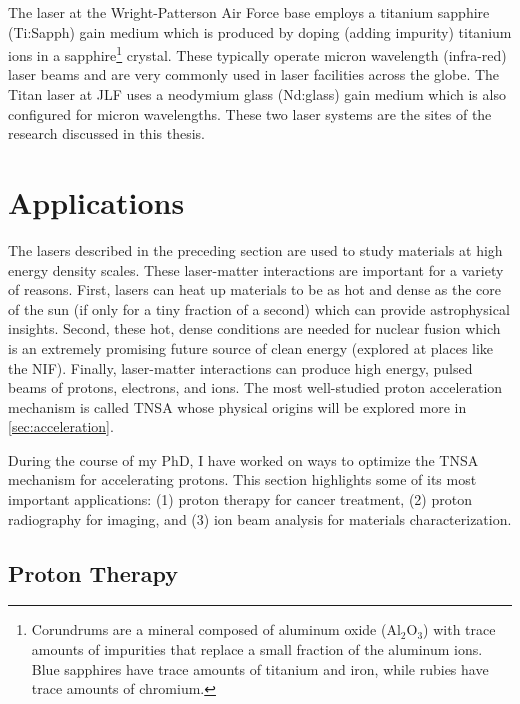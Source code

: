 The laser at the Wright-Patterson Air Force base employs a titanium sapphire (Ti:Sapph) gain medium which is produced by doping (adding impurity) titanium ions in a sapphire\footnote{Corundrums are a mineral composed of aluminum oxide ($\text{Al}_2\text{O}_3$) with trace amounts of impurities that replace a small fraction of the aluminum ions. Blue sapphires have trace amounts of titanium and iron, while rubies have trace amounts of chromium.} crystal. These typically operate micron wavelength (infra-red) laser beams and are very commonly used in laser facilities across the globe. The Titan laser at \gls{JLF} uses a neodymium glass (Nd:glass) gain medium which is also configured for micron wavelengths. These two laser systems are the sites of the research discussed in this thesis.


\section{Applications}

The lasers described in the preceding section are used to study materials at high energy density scales. These laser-matter interactions are important for a variety of reasons. First, lasers can heat up materials to be as hot and dense as the core of the sun (if only for a tiny fraction of a second) which can provide astrophysical insights. Second, these hot, dense conditions are needed for nuclear fusion which is an extremely promising future source of clean energy (explored at places like the \gls{NIF}). Finally, laser-matter interactions can produce high energy, pulsed beams of protons, electrons, and ions. The most well-studied proton acceleration mechanism is called \gls{TNSA} whose physical origins will be explored more in \autoref{sec:acceleration}. 

During the course of my PhD, I have worked on ways to optimize the \gls{TNSA} mechanism for accelerating protons. This section highlights some of its most important applications: (1) proton therapy for cancer treatment, (2) proton radiography for imaging, and (3) ion beam analysis for materials characterization.


\subsection{Proton Therapy}

